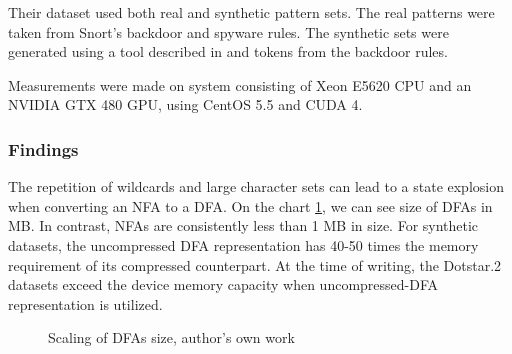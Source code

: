 \documentclass[10pt,onecolumn,twoside,english,a4paper]{article}
\begin{document}
Their dataset used both real and synthetic pattern sets. The real patterns were taken from Snort's backdoor and spyware rules. The synthetic sets were generated using a tool described in \cite{becchi2008workload} and tokens from the backdoor rules.

Measurements were made on system consisting of Xeon E5620 CPU and an NVIDIA  GTX 480 GPU, using CentOS 5.5 and CUDA 4.
\subsubsection{Findings}
The repetition of wildcards and large character sets can lead to a state explosion when converting an NFA to a DFA. On the chart \ref{dfas_size:becchi}, we can see size of DFAs in MB. In contrast, NFAs are consistently less than 1 MB in size. For synthetic datasets, the uncompressed DFA representation has 40-50 times the memory requirement of its compressed counterpart. At the time of writing, the Dotstar.2 datasets exceed the device memory capacity when uncompressed-DFA representation is utilized.
\begin{figure}[h!]
  \centering
  \caption{Scaling of DFAs size, author's own work}
  \label{dfas_size:becchi}
\end{figure}
\end{document}
